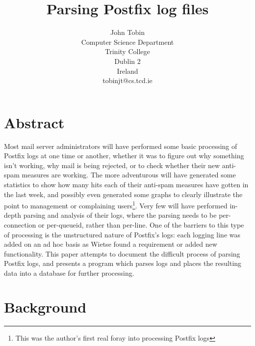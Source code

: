 \documentclass[a4paper,12pt,draft]{article}
\begin{document}
\title{Parsing Postfix log files}
\author{John Tobin \\ Computer Science Department \\ Trinity College \\
Dublin 2 \\ Ireland \\ tobinjt@cs.tcd.ie}
\date{}
\maketitle

\section{Abstract}

Most mail server administrators will have performed some basic processing
of Postfix logs at one time or another, whether it was to figure out why
something isn't working, why mail is being rejected, or to check whether
their new anti-spam measures are working.  The more adventurous will have
generated some statistics to show how many hits each of their anti-spam
measures have gotten in the last week, and possibly even generated some
graphs to clearly illustrate the point to management or complaining
users\footnote{This was the author's first real foray into processing
Postfix logs}.  Very few will have performed in-depth parsing and analysis
of their logs, where the parsing needs to be per-connection or per-queueid,
rather than per-line.  One of the barriers to this type of processing is
the unstructured nature of Postfix's logs: each logging line was added on
an ad hoc basis as Wietse found a requirement or added new functionality.
This paper attempts to document the difficult process of parsing Postfix
logs, and presents a program which parses logs and places the resulting
data into a database for further processing.


\section{Background}
\end{document}
